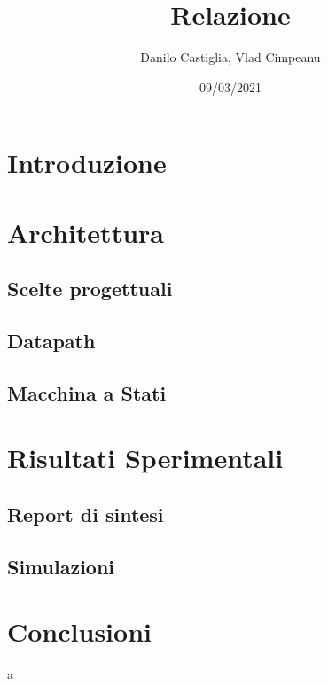 \documentclass{article}
\title{Relazione}
\date{09/03/2021}
\author{Danilo Castiglia, Vlad Cimpeanu}
\begin{document}
\maketitle
{}
\newpage
{}

\section{Introduzione}
\section{Architettura}
\subsection{Scelte progettuali}

\newpage
\subsection{Datapath}

\subsection{Macchina a Stati}

\section{Risultati Sperimentali}
\subsection{Report di sintesi}
\subsection{Simulazioni}
\section{Conclusioni}

a


\end{document}
